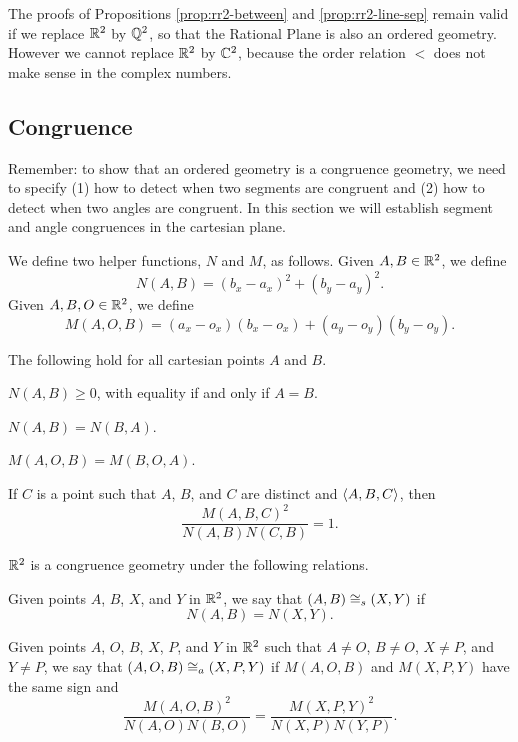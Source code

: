 The proofs of Propositions \ref{prop:rr2-between} and \ref{prop:rr2-line-sep} remain valid if we replace \(\mathbb{R}^2\) by \(\mathbb{Q}^2\), so that the Rational Plane is also an ordered geometry.
However we cannot replace \(\mathbb{R}^2\) by \(\mathbb{C}^2\), because the order relation \(<\) does not make sense in the complex numbers.

\subsection*{Congruence}

Remember: to show that an ordered geometry is a congruence geometry, we need to specify (1) how to detect when two segments are congruent and (2) how to detect when two angles are congruent.
In this section we will establish segment and angle congruences in the cartesian plane.

We define two helper functions, \(N\) and \(M\), as follows.
Given \(A,B \in \mathbb{R}^2\), we define \[ N(A,B) = (b_x - a_x)^2 + (b_y - a_y)^2. \]
Given \(A,B,O \in \mathbb{R}^2\), we define \[ M(A,O,B) = (a_x - o_x)(b_x - o_x) + (a_y - o_y)(b_y - o_y). \]

\begin{prop}\label{prop:rr2-cong-helper}
The following hold for all cartesian points \(A\) and \(B\).
\begin{proplist}
\item \label{prop:rr2-cong-helper:zero} \(N(A,B) \geq 0\), with equality if and only if \(A = B\).
\item \label{prop:rr2-cong-helper:sym} \(N(A,B) = N(B,A)\).
\item \(M(A,O,B) = M(B,O,A)\).
\item If \(C\) is a point such that \(A\), \(B\), and \(C\) are distinct and \(\langle A, B, C \rangle\), then \[ \frac{M(A,B,C)^2}{N(A,B)N(C,B)} = 1. \]
\end{proplist}
\end{prop}

\begin{prop}
\(\mathbb{R}^2\) is a congruence geometry under the following relations.
\begin{proplist}
\item Given points \(A\), \(B\), \(X\), and \(Y\) in \(\mathbb{R}^2\), we say that \((A,B) \cong_s (X,Y)\) if \[ N(A,B) = N(X,Y). \]
\item Given points \(A\), \(O\), \(B\), \(X\), \(P\), and \(Y\) in \(\mathbb{R}^2\) such that \(A \neq O\), \(B \neq O\), \(X \neq P\), and \(Y \neq P\), we say that \((A,O,B) \cong_a (X,P,Y)\) if \(M(A,O,B)\) and \(M(X,P,Y)\) have the same sign and \[ \frac{M(A,O,B)^2}{N(A,O)N(B,O)} = \frac{M(X,P,Y)^2}{N(X,P)N(Y,P)}. \]
\end{proplist}
\end{prop}

